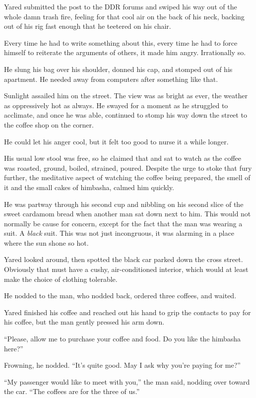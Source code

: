 Yared submitted the post to the DDR forums and swiped his way out of the whole damn trash fire, feeling for that cool air on the back of his neck, backing out of his rig fast enough that he teetered on his chair.

Every time he had to write something about this, every time he had to force himself to reiterate the arguments of others, it made him angry. Irrationally so.

He slung his bag over his shoulder, donned his cap, and stomped out of his apartment. He needed away from computers after something like that.

Sunlight assailed him on the street. The view was as bright as ever, the weather as oppressively hot as always. He swayed for a moment as he struggled to acclimate, and once he was able, continued to stomp his way down the street to the coffee shop on the corner.

He could let his anger cool, but it felt too good to nurse it a while longer.

His usual low stool was free, so he claimed that and sat to watch as the coffee was roasted, ground, boiled, strained, poured. Despite the urge to stoke that fury further, the meditative aspect of watching the coffee being prepared, the smell of it and the small cakes of himbasha, calmed him quickly.

He was partway through his second cup and nibbling on his second slice of the sweet cardamom bread when another man sat down next to him. This would not normally be cause for concern, except for the fact that the man was wearing a suit. A \emph{black} suit. This was not just incongruous, it was alarming in a place where the sun shone so hot.

Yared looked around, then spotted the black car parked down the cross street. Obviously that must have a cushy, air-conditioned interior, which would at least make the choice of clothing tolerable.

He nodded to the man, who nodded back, ordered three coffees, and waited.

Yared finished his coffee and reached out his hand to grip the contacts to pay for his coffee, but the man gently pressed his arm down.

``Please, allow me to purchase your coffee and food. Do you like the himbasha here?''

Frowning, he nodded. ``It's quite good. May I ask why you're paying for me?''

``My passenger would like to meet with you,'' the man said, nodding over toward the car. ``The coffees are for the three of us.''

